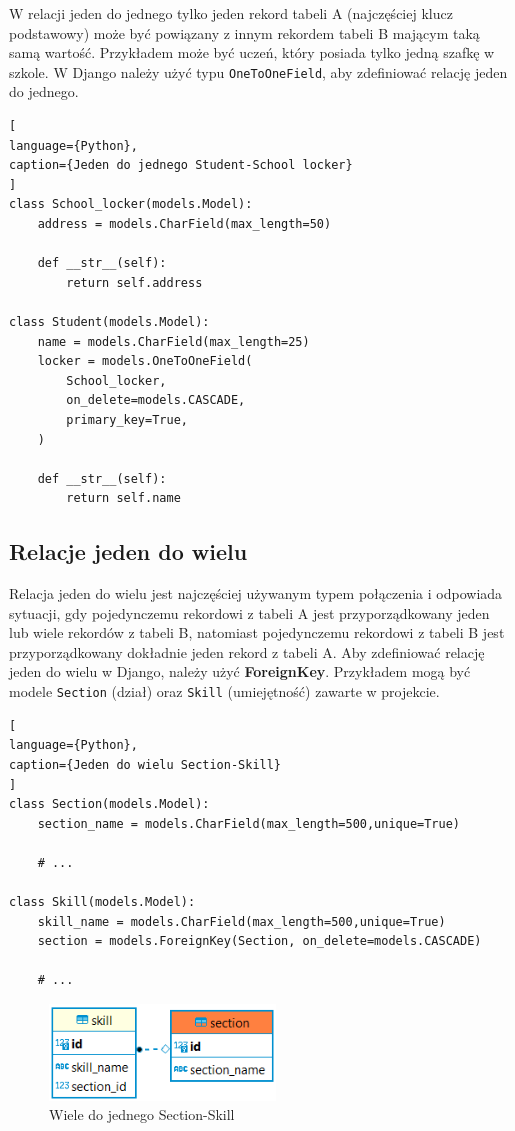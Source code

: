 \documentclass[oneside,polski,logo,indent]{amuthesis}
\begin{document}
W relacji jeden do jednego tylko jeden rekord tabeli A (najczęściej klucz podstawowy) może być powiązany z innym rekordem tabeli B mającym taką samą wartość. Przykładem może być uczeń, który posiada tylko jedną szafkę w szkole.
W Django należy użyć typu \texttt{OneToOneField}, aby zdefiniować relację jeden do jednego.
\begin{lstlisting}[
language={Python},
caption={Jeden do jednego Student-School locker}
]
class School_locker(models.Model):
    address = models.CharField(max_length=50)

    def __str__(self):
        return self.address

class Student(models.Model):
    name = models.CharField(max_length=25)
    locker = models.OneToOneField(
        School_locker,
        on_delete=models.CASCADE,
        primary_key=True,
    )

    def __str__(self):
        return self.name
\end{lstlisting}

\begin{center}
\subsection{Relacje jeden do wielu}
\end{center}

Relacja jeden do wielu jest najczęściej używanym typem połączenia i odpowiada sytuacji, gdy pojedynczemu rekordowi z tabeli A jest przyporządkowany jeden lub wiele rekordów z tabeli B, natomiast pojedynczemu rekordowi z tabeli B jest przyporządkowany dokładnie jeden rekord z tabeli A.
Aby zdefiniować relację jeden do wielu w Django, należy użyć \textbf{ForeignKey}. Przykładem mogą być modele \texttt{Section} (dział) oraz \texttt{Skill} (umiejętność) zawarte w projekcie.  \newpage 
\begin{lstlisting}[
language={Python},
caption={Jeden do wielu Section-Skill}
]
class Section(models.Model):
    section_name = models.CharField(max_length=500,unique=True)

	# ...

class Skill(models.Model):
    skill_name = models.CharField(max_length=500,unique=True)
    section = models.ForeignKey(Section, on_delete=models.CASCADE)

	# ...

\end{lstlisting}

\begin{figure}[H]
  \centering
  \includegraphics[width=6cm]{skillsec.png}
  \caption{Wiele do jednego Section-Skill}
  \label{obraz-przyklad}
\end{figure}
\end{document}
